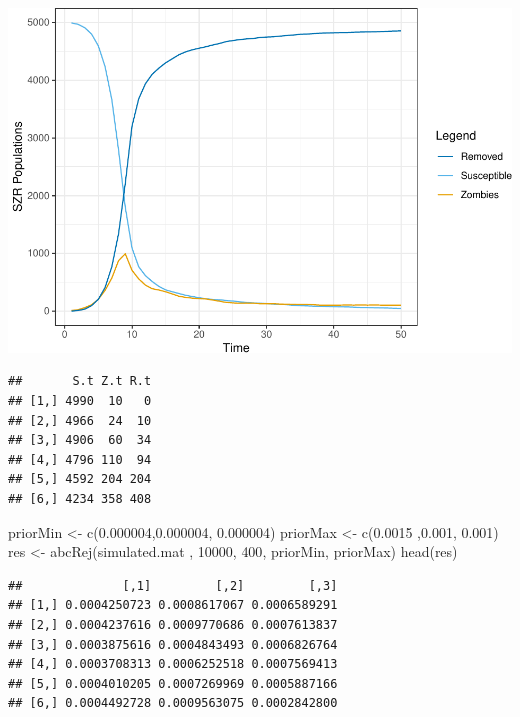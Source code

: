 \documentclass[
]{article}
\newenvironment{Shaded}{\begin{snugshade}}{\end{snugshade}}
\newcommand{\DecValTok}[1]{\textcolor[rgb]{0.00,0.00,0.81}{#1}}
\newcommand{\FloatTok}[1]{\textcolor[rgb]{0.00,0.00,0.81}{#1}}
\newcommand{\FunctionTok}[1]{\textcolor[rgb]{0.00,0.00,0.00}{#1}}
\newcommand{\NormalTok}[1]{#1}
\newcommand{\OtherTok}[1]{\textcolor[rgb]{0.56,0.35,0.01}{#1}}
\newcommand{\SpecialCharTok}[1]{\textcolor[rgb]{0.00,0.00,0.00}{#1}}
\begin{document}
\begin{center}\includegraphics[width=0.6\linewidth]{SC2_Report_files/figure-latex/eval-1} \end{center}

\begin{Shaded}
\end{Shaded}

\begin{verbatim}
##       S.t Z.t R.t
## [1,] 4990  10   0
## [2,] 4966  24  10
## [3,] 4906  60  34
## [4,] 4796 110  94
## [5,] 4592 204 204
## [6,] 4234 358 408
\end{verbatim}

\begin{Shaded}
\begin{Highlighting}[]
\NormalTok{priorMin }\OtherTok{\textless{}{-}} \FunctionTok{c}\NormalTok{(}\FloatTok{0.000004}\NormalTok{,}\FloatTok{0.000004}\NormalTok{,  }\FloatTok{0.000004}\NormalTok{) }
\NormalTok{priorMax }\OtherTok{\textless{}{-}} \FunctionTok{c}\NormalTok{(}\FloatTok{0.0015}\NormalTok{ ,}\FloatTok{0.001}\NormalTok{, }\FloatTok{0.001}\NormalTok{)}
\NormalTok{res }\OtherTok{\textless{}{-}} \FunctionTok{abcRej}\NormalTok{(simulated.mat , }\DecValTok{10000}\NormalTok{, }\DecValTok{400}\NormalTok{, priorMin, priorMax)}
\FunctionTok{head}\NormalTok{(res)}
\end{Highlighting}
\end{Shaded}

\begin{verbatim}
##              [,1]         [,2]         [,3]
## [1,] 0.0004250723 0.0008617067 0.0006589291
## [2,] 0.0004237616 0.0009770686 0.0007613837
## [3,] 0.0003875616 0.0004843493 0.0006826764
## [4,] 0.0003708313 0.0006252518 0.0007569413
## [5,] 0.0004010205 0.0007269969 0.0005887166
## [6,] 0.0004492728 0.0009563075 0.0002842800
\end{verbatim}
\end{document}
